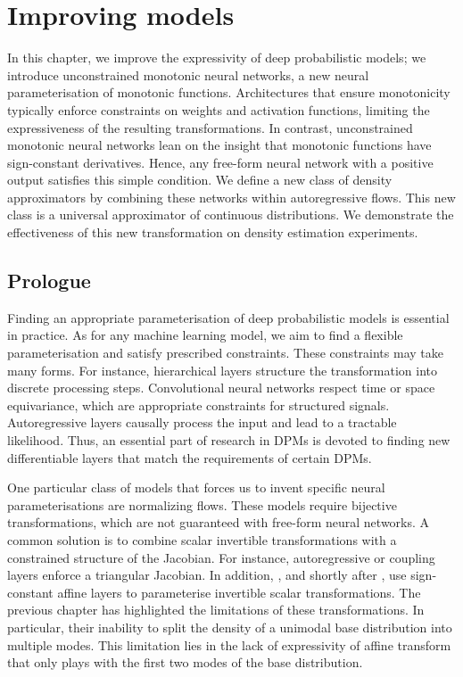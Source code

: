 \chapter{Improving models}\label{ch:05}

\begin{chapter_outline}

  In this chapter, we improve the expressivity of deep probabilistic models; we introduce unconstrained monotonic neural networks, a new neural parameterisation of monotonic functions.
  Architectures that ensure monotonicity typically enforce constraints on weights and activation functions, limiting the expressiveness of the resulting transformations.
  In contrast, unconstrained monotonic neural networks lean on the insight that monotonic functions have sign-constant derivatives. Hence, any free-form neural network with a positive output satisfies this simple condition.
  We define a new class of density approximators by combining these networks within autoregressive flows. This new class is a universal approximator of continuous distributions.
  We demonstrate the effectiveness of this new transformation on density estimation experiments.
\end{chapter_outline}

\section{Prologue}
Finding an appropriate parameterisation of deep probabilistic models is essential in practice. As for any machine learning model, we aim to find a flexible parameterisation and satisfy prescribed constraints. These constraints may take many forms. For instance, hierarchical layers structure the transformation into discrete processing steps. Convolutional neural networks respect time or space equivariance, which are appropriate constraints for structured signals. Autoregressive layers causally process the input and lead to a tractable likelihood. Thus, an essential part of research in DPMs is devoted to finding new differentiable layers that match the requirements of certain DPMs.

One particular class of models that forces us to invent specific neural parameterisations are normalizing flows. These models require bijective transformations, which are not guaranteed with free-form neural networks. A common solution is to combine scalar invertible transformations with a constrained structure of the Jacobian. For instance, autoregressive or coupling layers enforce a triangular Jacobian. In addition, \citet{rezende2015variational}, and shortly after \citet{kingma_improved_2016, dinh_density_2017}, use sign-constant affine layers to parameterise invertible scalar transformations. The previous chapter has highlighted the limitations of these transformations. In particular, their inability to split the density of a unimodal base distribution into multiple modes. This limitation lies in the lack of expressivity of affine transform that only plays with the first two modes of the base distribution.

